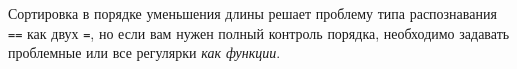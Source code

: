 Сортировка в порядке уменьшения длины решает проблему типа распознавания
\verb|==| как двух \verb|=|, но если вам нужен полный контроль порядка,
необходимо задавать проблемные или все регулярки \emph{как функции}.
 
\secup